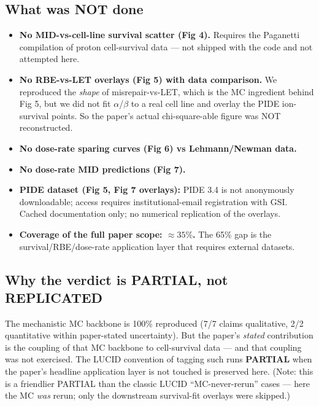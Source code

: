 \documentclass[11pt]{article}
\begin{document}
\subsection*{What was NOT done}
\begin{itemize}
  \item \textbf{No MID-vs-cell-line survival scatter (Fig 4).} Requires the Paganetti compilation of proton cell-survival data --- not shipped with the code and not attempted here.
  \item \textbf{No RBE-vs-LET overlays (Fig 5) with data comparison.} We reproduced the \emph{shape} of misrepair-vs-LET, which is the MC ingredient behind Fig 5, but we did not fit $\alpha$/$\beta$ to a real cell line and overlay the PIDE ion-survival points. So the paper's actual chi-square-able figure was NOT reconstructed.
  \item \textbf{No dose-rate sparing curves (Fig 6) vs Lehmann/Newman data.}
  \item \textbf{No dose-rate MID predictions (Fig 7).}
  \item \textbf{PIDE dataset (Fig 5, Fig 7 overlays):} PIDE 3.4 is not anonymously downloadable; access requires institutional-email registration with GSI. Cached documentation only; no numerical replication of the overlays.
  \item \textbf{Coverage of the full paper scope: $\approx 35\%$.} The 65\% gap is the survival/RBE/dose-rate application layer that requires external datasets.
\end{itemize}

\subsection*{Why the verdict is PARTIAL, not REPLICATED}
The mechanistic MC backbone is 100\% reproduced (7/7 claims qualitative, 2/2 quantitative within paper-stated uncertainty). But the paper's \emph{stated} contribution is the coupling of that MC backbone to cell-survival data --- and that coupling was not exercised. The LUCID convention of tagging such runs \textbf{PARTIAL} when the paper's headline application layer is not touched is preserved here. (Note: this is a friendlier PARTIAL than the classic LUCID ``MC-never-rerun'' cases --- here the MC \emph{was} rerun; only the downstream survival-fit overlays were skipped.)
\end{document}
